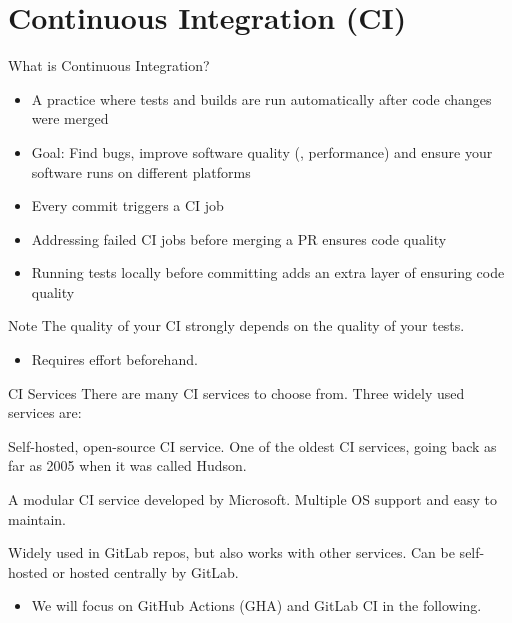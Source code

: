 \section{Continuous Integration (CI)}

\begin{frame}[fragile]{What is Continuous Integration?}
  \begin{itemize}
    \setlength{\itemsep}{1em}
    \item A practice where tests and builds are run automatically after code changes were
      merged
    \item Goal: Find bugs, improve software quality (\eg, performance) and ensure
      your software runs on different platforms
    \item Every commit triggers a CI job
    \item Addressing failed CI jobs before merging a PR ensures code quality
    \item Running tests locally before committing adds an extra layer of ensuring code quality
  \end{itemize}
  \begin{block}{Note}
     The quality of your CI strongly depends on the quality of your tests.
     \begin{itemize}
      \item Requires effort beforehand.
     \end{itemize}
  \end{block}
\end{frame}

\begin{frame}[fragile]{CI Services}
  There are many CI services to choose from. Three widely used services are:
  \begin{description}
    \setlength{\itemsep}{1em}
    \item[Jenkins] Self-hosted, open-source CI service. One of the oldest CI services,
      going back as far as 2005 when it was called Hudson.
    \item[GitHub Actions] A modular CI service developed by Microsoft. Multiple OS
      support and easy to maintain.
    \item[GitLab CI] Widely used in GitLab repos, but also works with
      other services. Can be self-hosted or hosted centrally by GitLab.
  \end{description}
  \begin{itemize}
    \item We will focus on GitHub Actions (GHA) and GitLab CI in the following.
  \end{itemize}
\end{frame}


